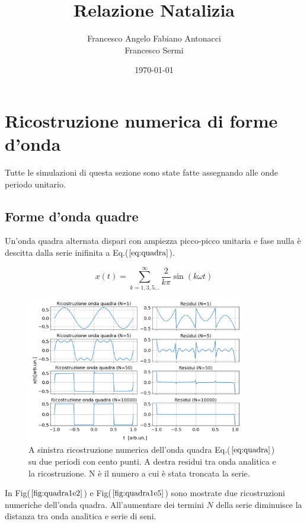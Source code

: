 \documentclass{article}
\author{Francesco Angelo Fabiano Antonacci\\Francesco Sermi}
\date{\today}
\title{Relazione Natalizia}
\begin{document}
\maketitle

\section{Ricostruzione numerica di forme d'onda}
    Tutte le simulazioni di questa sezione sono state fatte assegnando alle onde 
    periodo unitario.
    \subsection{Forme d'onda quadre}
    \label{sez:quadra}
        Un'onda quadra alternata dispari con ampiezza picco-picco unitaria e fase 
        nulla è descitta dalla serie inifinita a Eq.($\ref{eq:quadra}$).

        \begin{equation}
            x(t) = \sum_{k=1,3,5...}^{\infty} \frac{2}{k\pi}\sin\left(k\omega t\right)
            \label{eq:quadra}
        \end{equation}


        \begin{figure}[htbp]
            \centering
            \includegraphics[width=0.85\textwidth]{fousquarewave1e2.png} %
            \caption{A sinistra ricostruzione numerica dell'onda quadra Eq.($\ref{eq:quadra}$) su
                    due periodi con cento punti.
                    A destra residui tra onda analitica e la ricostruzione.
                    N è il numero a cui è stata troncata la serie.}
            \label{fig:quadra1e2}
        \end{figure}

        \noindent In Fig($\ref{fig:quadra1e2}$) e Fig($\ref{fig:quadra1e5}$) sono mostrate due ricostruzioni
        numeriche dell'onda quadra.
        All'aumentare dei termini $N$ della serie diminuisce la distanza tra onda analitica e serie 
        di seni.
\end{document}
